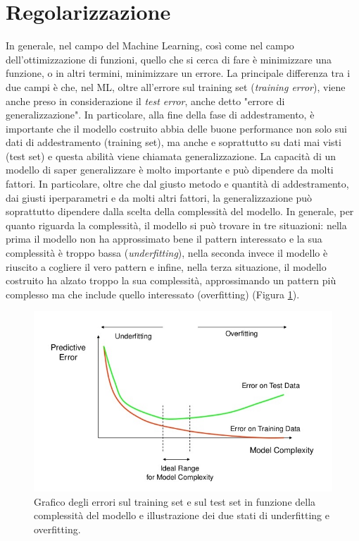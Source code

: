 \section{Regolarizzazione}
\label{regolarizzazione}
In generale, nel campo del Machine Learning, così come nel campo dell'ottimizzazione di funzioni, quello che si cerca di fare è minimizzare una funzione, o in altri termini, minimizzare un errore. La principale differenza tra i due campi è che, nel ML, oltre all'errore sul training set (\textit{training error}), viene anche preso in considerazione il \textit{test error}, anche detto "errore di generalizzazione". In particolare, alla fine della fase di addestramento, è importante che il modello costruito abbia delle buone performance non solo sui dati di addestramento (training set), ma anche e soprattutto su dati mai visti (test set) e questa abilità viene chiamata generalizzazione.
La capacità di un modello di saper generalizzare è molto importante e può dipendere da molti fattori. In particolare, oltre che dal giusto metodo e quantità di addestramento, dai giusti iperparametri e da molti altri fattori, la generalizzazione può soprattutto dipendere dalla scelta della complessità del modello. In generale, per quanto riguarda la complessità, il modello si può trovare in tre situazioni: nella prima il modello non ha approssimato bene il pattern interessato e la sua complessità è troppo bassa (\textit{underfitting}), nella seconda invece il modello è riuscito a cogliere il vero pattern e infine, nella terza situazione, il modello costruito ha alzato troppo la sua complessità, approssimando un pattern più complesso ma che include quello interessato (overfitting) (Figura \ref{fig:under-overfitting}). 

\begin{figure}[h!]
  \hspace*{-0.2in}
  \includegraphics[scale=0.6]{img/over_underfitting.jpeg}
  \caption{Grafico degli errori sul training set e sul test set in funzione della complessità del modello e illustrazione dei due stati di underfitting e overfitting.}
  \label{fig:under-overfitting}
\end{figure}


